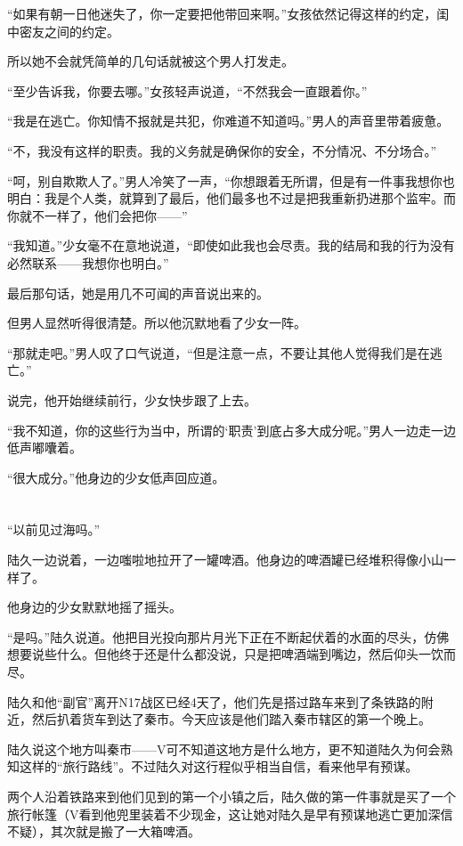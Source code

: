 “如果有朝一日他迷失了，你一定要把他带回来啊。”女孩依然记得这样的约定，闺中密友之间的约定。

所以她不会就凭简单的几句话就被这个男人打发走。

“至少告诉我，你要去哪。”女孩轻声说道，“不然我会一直跟着你。”

“我是在逃亡。你知情不报就是共犯，你难道不知道吗。”男人的声音里带着疲惫。

“不，我没有这样的职责。我的义务就是确保你的安全，不分情况、不分场合。”

“呵，别自欺欺人了。”男人冷笑了一声，“你想跟着无所谓，但是有一件事我想你也明白：我是个人类，就算到了最后，他们最多也不过是把我重新扔进那个监牢。而你就不一样了，他们会把你——”

“我知道。”少女毫不在意地说道，“即使如此我也会尽责。我的结局和我的行为没有必然联系——我想你也明白。”

最后那句话，她是用几不可闻的声音说出来的。

但男人显然听得很清楚。所以他沉默地看了少女一阵。

“那就走吧。”男人叹了口气说道，“但是注意一点，不要让其他人觉得我们是在逃亡。”

说完，他开始继续前行，少女快步跟了上去。

“我不知道，你的这些行为当中，所谓的‘职责’到底占多大成分呢。”男人一边走一边低声嘟囔着。

“很大成分。”他身边的少女低声回应道。

\section*{}

“以前见过海吗。”

陆久一边说着，一边嗤啦地拉开了一罐啤酒。他身边的啤酒罐已经堆积得像小山一样了。

他身边的少女默默地摇了摇头。

“是吗。”陆久说道。他把目光投向那片月光下正在不断起伏着的水面的尽头，仿佛想要说些什么。但他终于还是什么都没说，只是把啤酒端到嘴边，然后仰头一饮而尽。

陆久和他“副官”离开N17战区已经4天了，他们先是搭过路车来到了条铁路的附近，然后扒着货车到达了秦市。今天应该是他们踏入秦市辖区的第一个晚上。

陆久说这个地方叫秦市——V可不知道这地方是什么地方，更不知道陆久为何会熟知这样的“旅行路线”。不过陆久对这行程似乎相当自信，看来他早有预谋。

两个人沿着铁路来到他们见到的第一个小镇之后，陆久做的第一件事就是买了一个旅行帐篷（V看到他兜里装着不少现金，这让她对陆久是早有预谋地逃亡更加深信不疑），其次就是搬了一大箱啤酒。

